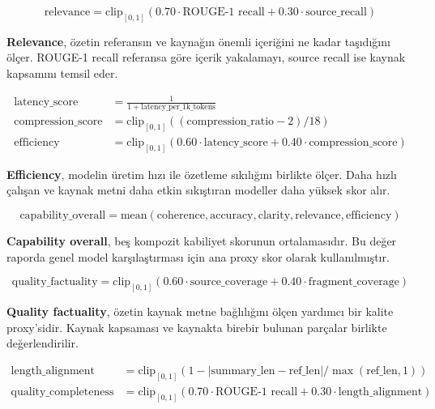 \documentclass[12pt,a4paper]{article}
\begin{document}
\begin{equation}
\text{relevance} = \text{clip}_{[0,1]}(0.70 \cdot \text{ROUGE-1 recall} + 0.30 \cdot \text{source\_recall})
\end{equation}

\textbf{Relevance}, özetin referansın ve kaynağın önemli içeriğini ne kadar taşıdığını ölçer. ROUGE-1 recall referansa göre içerik yakalamayı, source recall ise kaynak kapsamını temsil eder.

\begin{align}
\text{latency\_score} &= \frac{1}{1 + \text{latency\_per\_1k\_tokens}}\\
\text{compression\_score} &= \text{clip}_{[0,1]}((\text{compression\_ratio} - 2)/18)\\
\text{efficiency} &= \text{clip}_{[0,1]}(0.60 \cdot \text{latency\_score} + 0.40 \cdot \text{compression\_score})
\end{align}

\textbf{Efficiency}, modelin üretim hızı ile özetleme sıkılığını birlikte ölçer. Daha hızlı çalışan ve kaynak metni daha etkin sıkıştıran modeller daha yüksek skor alır.

\begin{equation}
\text{capability\_overall} = \text{mean}(\text{coherence}, \text{accuracy}, \text{clarity}, \text{relevance}, \text{efficiency})
\end{equation}

\textbf{Capability overall}, beş kompozit kabiliyet skorunun ortalamasıdır. Bu değer raporda genel model karşılaştırması için ana proxy skor olarak kullanılmıştır.

\begin{equation}
\text{quality\_factuality} = \text{clip}_{[0,1]}(0.60 \cdot \text{source\_coverage} + 0.40 \cdot \text{fragment\_coverage})
\end{equation}

\textbf{Quality factuality}, özetin kaynak metne bağlılığını ölçen yardımcı bir kalite proxy'sidir. Kaynak kapsaması ve kaynakta birebir bulunan parçalar birlikte değerlendirilir.

\begin{align}
\text{length\_alignment} &= \text{clip}_{[0,1]}(1 - |\text{summary\_len} - \text{ref\_len}| / \max(\text{ref\_len}, 1))\\
\text{quality\_completeness} &= \text{clip}_{[0,1]}(0.70 \cdot \text{ROUGE-1 recall} + 0.30 \cdot \text{length\_alignment})
\end{align}
\end{document}
